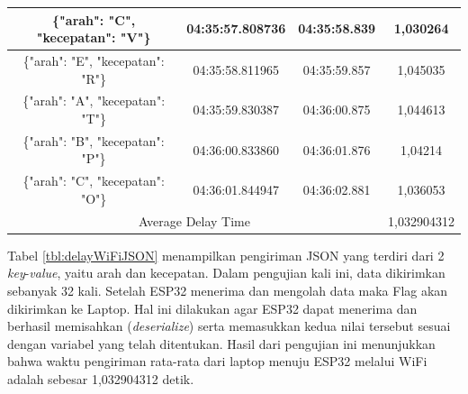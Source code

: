 \begin{longtable}{|ccc|c|}
  \multicolumn{1}{|c|}{\{"arah": "C", "kecepatan": "V"\}} & \multicolumn{1}{c|}{04:35:57.808736} & 04:35:58.839       & 1,030264    \\ \hline
  \multicolumn{1}{|c|}{\{"arah": "E", "kecepatan": "R"\}} & \multicolumn{1}{c|}{04:35:58.811965} & 04:35:59.857       & 1,045035    \\ \hline
  \multicolumn{1}{|c|}{\{"arah": "A", "kecepatan": "T"\}} & \multicolumn{1}{c|}{04:35:59.830387} & 04:36:00.875       & 1,044613    \\ \hline
  \multicolumn{1}{|c|}{\{"arah": "B", "kecepatan": "P"\}} & \multicolumn{1}{c|}{04:36:00.833860} & 04:36:01.876       & 1,04214     \\ \hline
  \multicolumn{1}{|c|}{\{"arah": "C", "kecepatan": "O"\}} & \multicolumn{1}{c|}{04:36:01.844947} & 04:36:02.881       & 1,036053    \\ \hline
  \multicolumn{3}{|c|}{Average Delay Time}                                                                            & 1,032904312 \\ \hline
  \end{longtable}

Tabel \ref{tbl:delayWiFiJSON} menampilkan pengiriman JSON yang terdiri dari 2 \emph{key}-\emph{value}, yaitu arah dan kecepatan. Dalam pengujian kali ini, data dikirimkan sebanyak 32 kali. Setelah ESP32 menerima dan mengolah data maka Flag akan dikirimkan ke Laptop. Hal ini dilakukan agar ESP32 dapat menerima dan berhasil memisahkan (\emph{deserialize}) serta memasukkan kedua nilai tersebut sesuai dengan variabel yang telah ditentukan. Hasil dari pengujian ini menunjukkan bahwa waktu pengiriman rata-rata dari laptop menuju ESP32 melalui WiFi adalah sebesar 1,032904312 detik.


